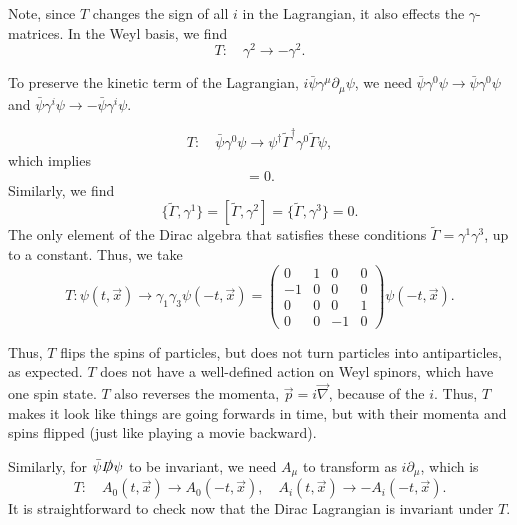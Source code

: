 \documentclass[11pt]{article}
\theoremstyle{definition}
\begin{document}
Note, since $T$ changes the sign of all $i$ in the Lagrangian, it also effects the $\gamma$-matrices. In the Weyl basis, we find
\begin{equation}
    T: \quad \gamma^2 \to -\gamma^2.
\end{equation}

To preserve the kinetic term of the Lagrangian, $i\bar{\psi}\gamma^\mu\partial_\mu\psi$, we need  $\bar{\psi}\gamma^0\psi \to \bar{\psi}\gamma^0\psi$ and $\bar{\psi}\gamma^i\psi \to -\bar{\psi}\gamma^i\psi$.

\begin{equation}
    T: \quad \bar{\psi}\gamma^0\psi \to \psi^\dagger\tilde{\Gamma}^\dagger\gamma^0\tilde{\Gamma}\psi,
\end{equation}
which implies
\begin{equation}
    [\tilde{\Gamma}, \gamma^0] = 0.
\end{equation}
Similarly, we find
\begin{equation}
    \{\tilde{\Gamma}, \gamma^1\} = [\tilde{\Gamma}, \gamma^2] = \{\tilde{\Gamma}, \gamma^3\} =0.
\end{equation}
The only element of the Dirac algebra that satisfies these conditions $\tilde{\Gamma} = \gamma^1\gamma^3$, up to a constant. Thus, we take
\begin{equation}
T : \psi(t, \vec{x}) \to \gamma_1 \gamma_3 \psi(-t, \vec{x}) =
\begin{pmatrix}
0 & 1 & 0 & 0 \\
-1 & 0 & 0 & 0 \\
0 & 0 & 0 & 1 \\
0 & 0 & -1 & 0
\end{pmatrix}
\psi(-t, \vec{x}).
\end{equation}

Thus, \( T \) flips the spins of particles, but does not turn particles into antiparticles, as expected. \( T \) does not have a well-defined action on Weyl spinors, which have one spin state. \( T \) also reverses the momenta, \( \vec{p} = i\vec{\nabla} \), because of the \( i \). Thus, \( T \) makes it look like things are going forwards in time, but with their momenta and spins flipped (just like playing a movie backward).

Similarly, for \( \bar{\psi} \slashed{D}\psi \) to be invariant, we need \( A_{\mu} \) to transform as \( i\partial_{\mu} \), which is
\begin{equation}
T : \quad A_0(t, \vec{x}) \rightarrow A_0(-t, \vec{x}), \quad A_i(t, \vec{x}) \rightarrow -A_i(-t, \vec{x}).
\end{equation}
It is straightforward to check now that the Dirac Lagrangian is invariant under \( T \).
\end{document}
